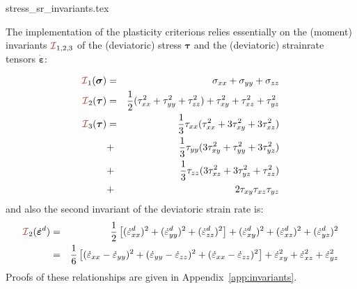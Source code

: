 \begin{flushright} {\tiny {\color{gray} stress\_sr\_invariants.tex}} \end{flushright}

The implementation of the plasticity criterions relies essentially 
on the (moment) invariants $\III_{1,2,3}$ of the (deviatoric) stress ${\bm \tau}$ 
and the (deviatoric) strainrate tensors $\dot{\bm \varepsilon}$:

\begin{eqnarray}
{\III}_1({\bm \sigma}) &=& \sigma_{xx}+\sigma_{yy}+\sigma_{zz}\\
{\III}_2({\bm \tau})   
&=&\frac{1}{2}(\tau_{xx}^2 + \tau_{yy}^2 + \tau_{zz}^2 ) + \tau_{xy}^2 + \tau_{xz}^2 + \tau_{yz}^2  \\
{\III}_3({\bm \tau}) 
&=& \frac{1}{3} \tau_{xx} (  \tau_{xx}^2 + 3 \tau_{xy}^2 + 3 \tau_{xz}^2  )     \nonumber\\
&+& \frac{1}{3} \tau_{yy} (3 \tau_{xy}^2 +   \tau_{yy}^2 + 3 \tau_{yz}^2  )     \nonumber\\
&+& \frac{1}{3} \tau_{zz} (3 \tau_{xz}^2 + 3 \tau_{yz}^2 +   \tau_{zz}^2)       \nonumber\\
&+& 2 \tau_{xy} \tau_{xz} \tau_{yz}  
\end{eqnarray}
and also the second invariant of the deviatoric strain rate is:
\begin{eqnarray}
{\III}_2(\dot{\bm{\varepsilon}}^d)
&=& \frac{1}{2} \left[ (\dot{\varepsilon}_{xx}^d)^2 + (\dot{\varepsilon}_{yy}^d)^2 + (\dot{\varepsilon}_{zz}^d)^2   \right] 
+ (\dot{\varepsilon}_{xy}^d)^2  
+ (\dot{\varepsilon}_{xz}^d)^2  
+ (\dot{\varepsilon}_{yz}^d)^2  \nonumber\\
&=& \frac{1}{6} \left[ (\dot{\varepsilon}_{xx}-\dot{\varepsilon}_{yy})^2 
+ (\dot{\varepsilon}_{yy}-\dot{\varepsilon}_{zz})^2 
+ (\dot{\varepsilon}_{xx}-\dot{\varepsilon}_{zz})^2 \right] 
+ \dot{\varepsilon}_{xy}^2 + \dot{\varepsilon}_{xz}^2 + \dot{\varepsilon}_{yz}^2 \label{eq:I2epsd} 
\end{eqnarray}
Proofs of these relationships are given in Appendix~\ref{app:invariants}.

